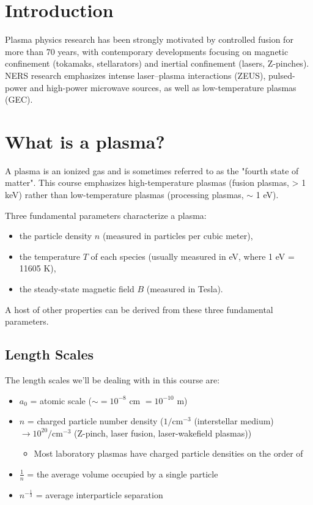 \newpage
\section{Introduction}

Plasma physics research has been strongly motivated by controlled fusion for more than 70 years, with contemporary developments focusing on magnetic confinement (tokamaks, stellarators) and inertial confinement (lasers, Z-pinches). NERS research emphasizes intense laser–plasma interactions (ZEUS), pulsed-power and high-power microwave sources, as well as low-temperature plasmas (GEC).

\section{What is a plasma?}
A plasma is an ionized gas and is sometimes referred to as the "fourth state of matter". This course emphasizes high-temperature plasmas (fusion plasmas, > 1 keV) rather than low-temperature plasmas (processing plasmas, $\sim$ 1 eV).

Three fundamental parameters characterize a plasma:
\begin{itemize}
  \item the particle density $n$ (measured in particles per cubic meter),
  \item the temperature $T$ of each species (usually measured in eV, where 1 eV = 11605 K),
  \item the steady-state magnetic field $B$ (measured in Tesla).
\end{itemize}

A host of other properties can be derived from these three fundamental parameters.

\subsection{Length Scales}

The length scales we'll be dealing with in this course are:
\begin{itemize}
  \item $a_0$ = atomic scale ($\sim = 10^{-8}$ cm $= 10^{-10}$ m)
  \item $n$ = charged particle number density ($1/\text{cm}^{-3}$ (interstellar medium) $\longrightarrow 10^{20}/\text{cm}^{-3}$ (Z-pinch, laser fusion, laser-wakefield plasmas))
    \begin{itemize}
      \item Most laboratory plasmas have charged particle densities on the order of 
    \end{itemize}

  \item $\frac{1}{n}$ = the average volume occupied by a single particle
  \item $n^{-\frac{1}{3}}$ = average interparticle separation
\end{itemize}

